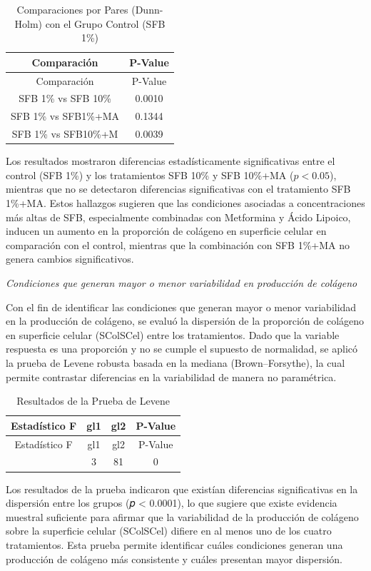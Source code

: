 \documentclass[
  11pt,
]{article}
\begin{document}
\begin{longtable}[]{@{}cc@{}}
\caption{Comparaciones por Pares (Dunn-Holm) con el Grupo Control (SFB
1\%)}\tabularnewline
\toprule\noalign{}
Comparación & P-Value \\
\midrule\noalign{}
\endfirsthead
\toprule\noalign{}
Comparación & P-Value \\
\midrule\noalign{}
\endhead
\bottomrule\noalign{}
\endlastfoot
SFB 1\% vs SFB 10\% & 0.0010 \\
SFB 1\% vs SFB1\%+MA & 0.1344 \\
SFB 1\% vs SFB10\%+M & 0.0039 \\
\end{longtable}

Los resultados mostraron diferencias estadísticamente significativas
entre el control (SFB 1\%) y los tratamientos SFB 10\% y SFB 10\%+MA
(\(p < 0.05\)), mientras que no se detectaron diferencias significativas
con el tratamiento SFB 1\%+MA. Estos hallazgos sugieren que las
condiciones asociadas a concentraciones más altas de SFB, especialmente
combinadas con Metformina y Ácido Lipoico, inducen un aumento en la
proporción de colágeno en superficie celular en comparación con el
control, mientras que la combinación con SFB 1\%+MA no genera cambios
significativos.

\emph{Condiciones que generan mayor o menor variabilidad en producción
de colágeno}

Con el fin de identificar las condiciones que generan mayor o menor
variabilidad en la producción de colágeno, se evaluó la dispersión de la
proporción de colágeno en superficie celular (SColSCel) entre los
tratamientos. Dado que la variable respuesta es una proporción y no se
cumple el supuesto de normalidad, se aplicó la prueba de Levene robusta
basada en la mediana (Brown--Forsythe), la cual permite contrastar
diferencias en la variabilidad de manera no paramétrica.

\begin{longtable}[]{@{}cccc@{}}
\caption{Resultados de la Prueba de Levene}\tabularnewline
\toprule\noalign{}
Estadístico F & gl1 & gl2 & P-Value \\
\midrule\noalign{}
\endfirsthead
\toprule\noalign{}
Estadístico F & gl1 & gl2 & P-Value \\
\midrule\noalign{}
\endhead
\bottomrule\noalign{}
\endlastfoot
10.6844 & 3 & 81 & 0 \\
\end{longtable}

Los resultados de la prueba indicaron que existían diferencias
significativas en la dispersión entre los grupos (𝑝 \textless{} 0.0001),
lo que sugiere que existe evidencia muestral suficiente para afirmar que
la variabilidad de la producción de colágeno sobre la superficie celular
(SColSCel) difiere en al menos uno de los cuatro tratamientos. Esta
prueba permite identificar cuáles condiciones generan una producción de
colágeno más consistente y cuáles presentan mayor dispersión.
\end{document}
